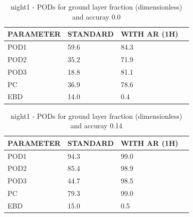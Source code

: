 \begin{table}[p!]
\begin{center}
\begin{tabular}{|l|l|l|l|}
\hline
\multicolumn{1}{|c|}{\cellcolor[HTML]{C0C0C0}\textbf{PARAMETER}} & \multicolumn{1}{c|}{\cellcolor[HTML]{C0C0C0}\textbf{STANDARD}} & \multicolumn{1}{c|}{\cellcolor[HTML]{C0C0C0}\textbf{WITH AR (1H)}} \\
\hline
\cellcolor[HTML]{C0C0C0}POD1  & 59.6                                & 84.3         \\
\cellcolor[HTML]{C0C0C0}POD2  & 35.2                                & 71.9         \\
\cellcolor[HTML]{C0C0C0}POD3  & 18.8                                & 81.1         \\
\cellcolor[HTML]{C0C0C0}PC    & 36.9                                  & 78.6           \\
\cellcolor[HTML]{C0C0C0}EBD   & 14.0                                 & 0.4          \\
\hline
\end{tabular}
\caption{night1 - PODs for ground layer fraction (dimensionless) and accuray 0.0}
\label{tab:podglf0.0:night1}
\end{center}
\end{table}
\begin{table}[p!]
\begin{center}
\begin{tabular}{|l|l|l|l|}
\hline
\multicolumn{1}{|c|}{\cellcolor[HTML]{C0C0C0}\textbf{PARAMETER}} & \multicolumn{1}{c|}{\cellcolor[HTML]{C0C0C0}\textbf{STANDARD}} & \multicolumn{1}{c|}{\cellcolor[HTML]{C0C0C0}\textbf{WITH AR (1H)}} \\
\hline
\cellcolor[HTML]{C0C0C0}POD1  & 94.3                                & 99.0         \\
\cellcolor[HTML]{C0C0C0}POD2  & 85.4                                & 98.9         \\
\cellcolor[HTML]{C0C0C0}POD3  & 44.7                                & 98.5         \\
\cellcolor[HTML]{C0C0C0}PC    & 79.3                                  & 99.0           \\
\cellcolor[HTML]{C0C0C0}EBD   & 15.0                                 & 0.5          \\
\hline
\end{tabular}
\caption{night1 - PODs for ground layer fraction (dimensionless) and accuray 0.14}
\label{tab:podglf0.14:night1}
\end{center}
\end{table}
